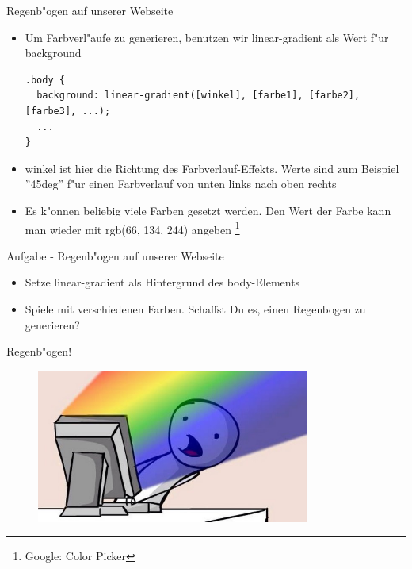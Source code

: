 \documentclass[18pt]{beamer}
\begin{document}
\begin{frame}[fragile]{Regenb"ogen auf unserer Webseite}
\begin{itemize}
\item Um Farbverl"aufe zu generieren, benutzen wir linear-gradient als Wert f"ur background
\begin{lstlisting}
.body {
  background: linear-gradient([winkel], [farbe1], [farbe2], [farbe3], ...);
  ...
} 
\end{lstlisting}
\item winkel ist hier die Richtung des Farbverlauf-Effekts. Werte sind zum Beispiel ''45deg'' f"ur einen Farbverlauf von unten links nach oben rechts
\item Es k"onnen beliebig viele Farben gesetzt werden. Den Wert der Farbe kann man wieder mit rgb(66, 134, 244) angeben \footnote{Google: Color Picker}
\end{itemize}
\end{frame}

\begin{frame}[fragile]{Aufgabe - Regenb"ogen auf unserer Webseite}
\begin{itemize}
\item Setze linear-gradient als Hintergrund des body-Elements
\item Spiele mit verschiedenen Farben. Schaffst Du es, einen Regenbogen zu generieren?
\end{itemize}
\end{frame}

\begin{frame}[fragile]{Regenb"ogen!}
\begin{figure}
\includegraphics[width=0.8\textwidth]{Rainbow} 
\end{figure}
\end{frame}
\end{document}

